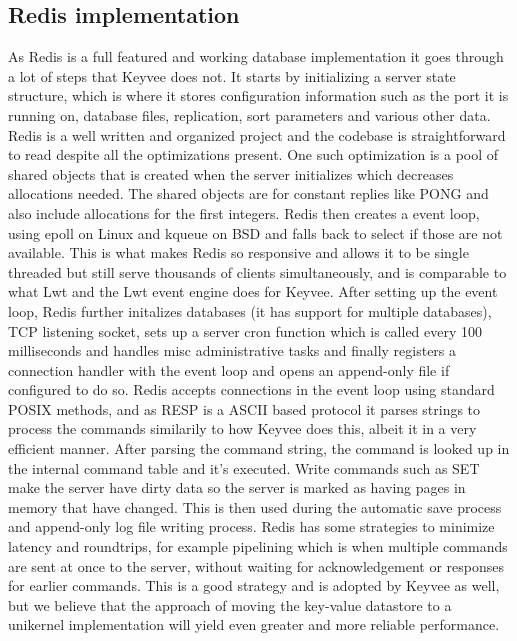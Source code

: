 \documentclass[english,10pt,twocolumn]{article}
\begin{document}
\subsection{Redis implementation}

As Redis is a full featured and working database implementation it goes through a lot of steps that Keyvee does not.
It starts by initializing a server state structure, which is where it stores configuration information such as the port it is running on, database files, replication, sort parameters and various other data.
Redis is a well written and organized project and the codebase is straightforward to read despite all the optimizations present.
One such optimization is a pool of shared objects that is created when the server initializes which decreases allocations needed.
The shared objects are for constant replies like PONG and also include allocations for the first integers. \cite{redisunderthehood}
Redis then creates a event loop, using epoll on Linux and kqueue on BSD and falls back to select if those are not available.
This is what makes Redis so responsive and allows it to be single threaded but still serve thousands of clients simultaneously, and is comparable to what Lwt and the Lwt event engine does for Keyvee.
After setting up the event loop, Redis further initalizes databases (it has support for multiple databases), TCP listening socket, sets up a server cron function which is called every 100 milliseconds and handles misc administrative tasks and finally registers a connection handler with the event loop and opens an append-only file if configured to do so.
Redis accepts connections in the event loop using standard POSIX methods, and as RESP is a ASCII based protocol it parses strings to process the commands similarily to how Keyvee does this, albeit it in a very efficient manner.
After parsing the command string, the command is looked up in the internal command table and it's executed.
Write commands such as SET make the server have dirty data so the server is marked as having pages in memory that have changed.
This is then used during the automatic save process and append-only log file writing process.
Redis has some strategies to minimize latency and roundtrips, for example pipelining which is when multiple commands are sent at once to the server, without waiting for acknowledgement or responses for earlier commands.
This is a good strategy and is adopted by Keyvee as well, but we believe that the approach of moving the key-value datastore to a unikernel implementation will yield even greater and more reliable performance.
\end{document}
